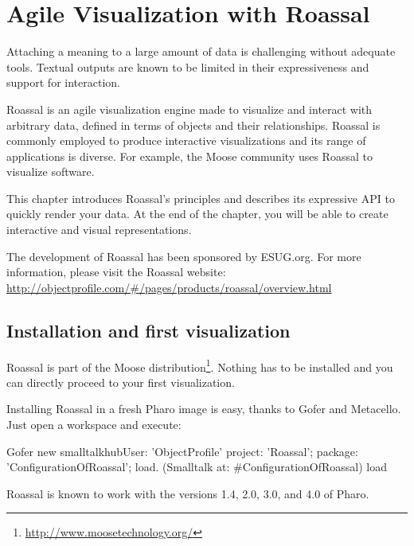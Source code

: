 \documentclass[a4paper,10pt,twoside]{book}
\begin{document}
\fi
\sloppy
\chapter{Agile Visualization with Roassal}


\chapterauthor{\authorvanessa}

Attaching a meaning to a large amount of data is challenging without adequate tools. Textual outputs are known to be limited in their expressiveness and support for interaction. 

Roassal is an agile visualization engine made to visualize and interact with arbitrary data, defined in terms of objects and their relationships. Roassal is commonly employed to produce interactive visualizations and its range of applications is diverse. For example, the Moose community uses Roassal to visualize software. 

This chapter introduces Roassal's principles and describes its expressive API to quickly render your data. At the end of the chapter, you will be able to create interactive and visual representations. 

The development of Roassal has been sponsored by ESUG.org. For more information, please visit the Roassal website: \\\noindent \url{http://objectprofile.com/\#/pages/products/roassal/overview.html}



\section{Installation and first visualization}
Roassal is part of the Moose distribution\footnote{\url{http://www.moosetechnology.org/}}. Nothing has to be installed and you can directly proceed to your first visualization.

Installing Roassal in a fresh Pharo image is easy, thanks to Gofer and Metacello. Just open a workspace and execute:

\begin{code}{}
Gofer new smalltalkhubUser: 'ObjectProfile'
	project: 'Roassal';
	package: 'ConfigurationOfRoassal';
	load.
(Smalltalk at: #ConfigurationOfRoassal) load
\end{code}

Roassal is known to work with the versions 1.4, 2.0, 3.0, and 4.0 of Pharo.
\end{document}
